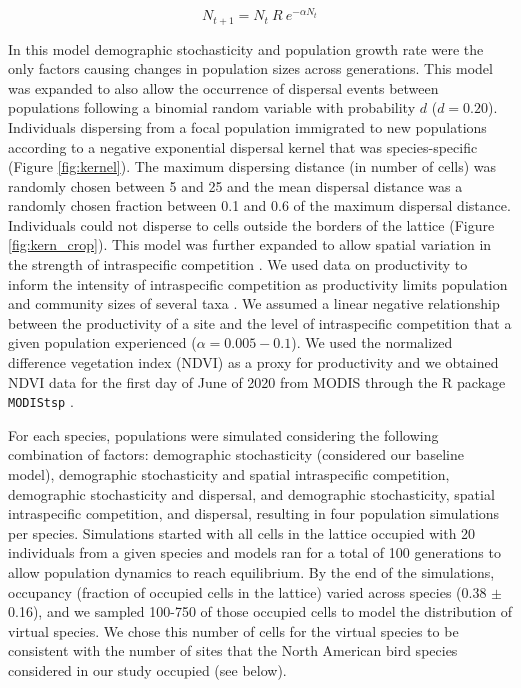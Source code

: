 \begin{equation}
\label{eq:ricker}
N_{t+1} = N_{t} \ R \ e^{- \alpha N_{t}}
\end{equation}  

In this model demographic stochasticity and population growth rate were the only factors causing changes in population sizes across generations. This model was expanded to also allow the occurrence of dispersal events between populations following a binomial random variable with probability $d$ ($d = 0.20$). Individuals dispersing from a focal population immigrated to new populations according to a negative exponential dispersal kernel \parencite{nathan2012} that was species-specific (Figure \ref{fig:kernel}). The maximum dispersing distance (in number of cells) was randomly chosen between 5 and 25 and the mean dispersal distance was a randomly chosen fraction between 0.1 and 0.6 of the maximum dispersal distance. Individuals could not disperse to cells outside the borders of the lattice (Figure \ref{fig:kern_crop}). This model was further expanded to allow spatial variation in the strength of intraspecific competition \parencite{zhang2021}. We used data on productivity to inform the intensity of intraspecific competition as productivity limits population and community sizes of several taxa \parencite{srivastava1998,cerezer2021}. We assumed a linear negative relationship between the productivity of a site and the level of intraspecific competition that a given population experienced ($\alpha = 0.005 - 0.1$). We used the normalized difference vegetation index (NDVI) as a proxy for productivity and we obtained NDVI data for the first day of June of 2020 from MODIS through the R package \texttt{MODIStsp} \parencite{busetto2016}. 

For each species, populations were simulated considering the following combination of factors: demographic stochasticity (considered our baseline model), demographic stochasticity and spatial intraspecific competition, demographic stochasticity and dispersal, and  demographic stochasticity, spatial intraspecific competition, and dispersal, resulting in four population simulations per species. Simulations started with all cells in the lattice occupied with 20 individuals from a given species and models ran for a total of 100 generations to allow population dynamics to reach equilibrium. By the end of the simulations, occupancy (fraction of occupied cells in the lattice) varied across species (0.38 $\pm$ 0.16), and we sampled 100-750 of those occupied cells to model the distribution of virtual species. We chose this number of cells for the virtual species to be consistent with the number of sites that the North American bird species considered in our study occupied (see below).   
 
